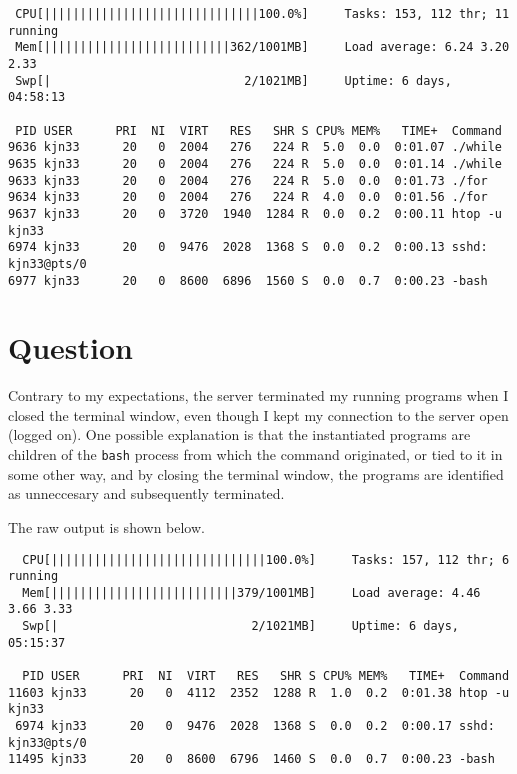\documentclass[letterpaper]{article}
\begin{document}
\begin{verbatim}
 CPU[||||||||||||||||||||||||||||||100.0%]     Tasks: 153, 112 thr; 11 running
 Mem[||||||||||||||||||||||||||362/1001MB]     Load average: 6.24 3.20 2.33
 Swp[|                           2/1021MB]     Uptime: 6 days, 04:58:13

 PID USER      PRI  NI  VIRT   RES   SHR S CPU% MEM%   TIME+  Command
9636 kjn33      20   0  2004   276   224 R  5.0  0.0  0:01.07 ./while
9635 kjn33      20   0  2004   276   224 R  5.0  0.0  0:01.14 ./while
9633 kjn33      20   0  2004   276   224 R  5.0  0.0  0:01.73 ./for
9634 kjn33      20   0  2004   276   224 R  4.0  0.0  0:01.56 ./for
9637 kjn33      20   0  3720  1940  1284 R  0.0  0.2  0:00.11 htop -u kjn33
6974 kjn33      20   0  9476  2028  1368 S  0.0  0.2  0:00.13 sshd: kjn33@pts/0
6977 kjn33      20   0  8600  6896  1560 S  0.0  0.7  0:00.23 -bash
\end{verbatim}
\newpage

\section{Question}

Contrary to my expectations, the server terminated my running programs when
I closed the terminal window, even though I kept my connection to the server
open (logged on). One possible explanation is that the instantiated programs
are children of the \texttt{bash} process from which the command originated,
or tied to it in some other way, and by closing the terminal window,
the programs are identified as unneccesary and subsequently terminated.

The raw output is shown below.

\begin{verbatim}
  CPU[||||||||||||||||||||||||||||||100.0%]     Tasks: 157, 112 thr; 6 running
  Mem[||||||||||||||||||||||||||379/1001MB]     Load average: 4.46 3.66 3.33
  Swp[|                           2/1021MB]     Uptime: 6 days, 05:15:37

  PID USER      PRI  NI  VIRT   RES   SHR S CPU% MEM%   TIME+  Command
11603 kjn33      20   0  4112  2352  1288 R  1.0  0.2  0:01.38 htop -u kjn33
 6974 kjn33      20   0  9476  2028  1368 S  0.0  0.2  0:00.17 sshd: kjn33@pts/0
11495 kjn33      20   0  8600  6796  1460 S  0.0  0.7  0:00.23 -bash
\end{verbatim}
\end{document}
